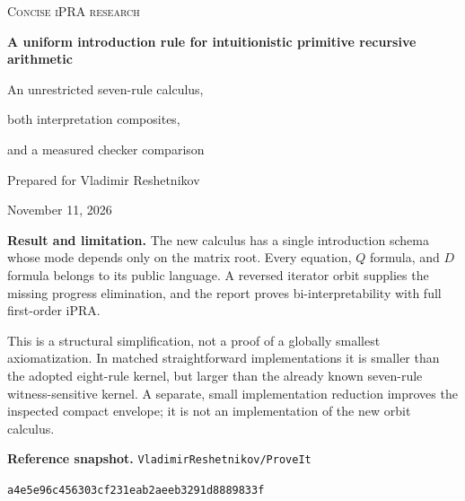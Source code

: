 \documentclass[11pt,a4paper]{article}
\theoremstyle{definition}
\begin{document}
\begin{titlepage}
\vspace*{12mm}
{\color{ink}\Large\textsc{Concise iPRA research}}\par
\vspace{9mm}
{\color{ink}\huge\bfseries A uniform introduction rule for intuitionistic primitive recursive arithmetic\par}
\vspace{7mm}
{\Large An unrestricted seven-rule calculus,\par both interpretation composites,\par and a measured checker comparison\par}
\vspace{12mm}
{\large Prepared for Vladimir Reshetnikov\par November 11, 2026\par}
\vfill
\textbf{Result and limitation.}
The new calculus has a single introduction schema whose mode depends only
on the matrix root. Every equation, $Q$ formula, and $D$ formula belongs to
its public language. A reversed iterator orbit supplies the missing
progress elimination, and the report proves bi-interpretability with
full first-order iPRA.

This is a structural simplification, not a proof of a globally smallest
axiomatization. In matched straightforward implementations it is smaller
than the adopted eight-rule kernel, but larger than the already known
seven-rule witness-sensitive kernel. A separate, small implementation
reduction improves the inspected compact envelope; it is not an
implementation of the new orbit calculus.\par
\vspace{8mm}
\textbf{Reference snapshot.}\quad
\texttt{VladimirReshetnikov/ProveIt}\par
\texttt{a4e5e96c456303cf231eab2aeeb3291d8889833f}\par
{}
\end{titlepage}
\end{document}
